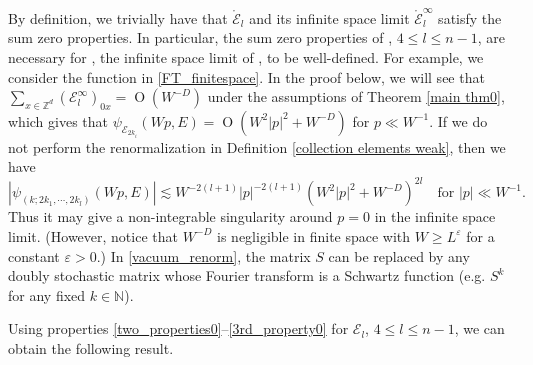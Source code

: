 \documentclass{article}
\newcommand{\1}{\mathds{1}}
\numberwithin{equation}{section}
\newcommand{\e}{{\varepsilon}}
\renewcommand{\leq}{\leqslant}
\renewcommand{\geq}{\geqslant}
\renewcommand{\le}{\leq}
\renewcommand{\ge}{\geq}
\newcommand{\N}{\mathbb{N}}
\newcommand{\Z}{\mathbb{Z}}
\DeclareMathOperator{\OO}{O}
\theoremstyle{plain} %
\theoremstyle{remark}
\newcommand{\Sele}{{\mathcal E}}
\begin{document}
By definition, we trivially have that $\mathring \Sele_l$ and its infinite space limit $\mathring \Sele_l^\infty$ satisfy the sum zero properties. In particular, the sum zero properties of \smash{$\mathring \Sele_l^\infty$}, $4\le l \le n-1$, are necessary for \smash{$\Sele_n^{(r),\infty}$}, the infinite space limit of \smash{$\Sele_n^{(r)}$}, to be well-defined. For example, we consider the function in \eqref{FT_finitespace}. In the proof below, we will see that $\sum_{x\in \Z^d}(\Sele^{\infty}_{l})_{0x} = \OO(W^{-D})$ under the assumptions of Theorem \ref{main thm0}, which gives that $\psi_{\Sele_{2k_i}}(Wp,E) = \OO(W^2|p|^2 + W^{-D})$ for $p\ll W^{-1}$. If we do not perform the renormalization in Definition \ref{collection elements weak}, then we have
$$\left|\psi_{ (k; 2k_1, \cdots, 2k_l)}(Wp,E)\right| \lesssim W^{-2(l+1)}|p|^{-2(l+1)} (W^2|p|^2 + W^{-D})^{2l} \quad \text{for $|p|\ll W^{-1}$}.  $$
Thus it may give a non-integrable singularity around $p=0$ in the infinite space limit. (However, notice that $W^{-D}$ is negligible in finite space with $W\ge L^{\e}$ for a constant $\e>0$.) In \eqref{vacuum_renorm}, the matrix $S$ can be replaced by any doubly stochastic matrix whose Fourier transform is a Schwartz function (e.g. $S^k$ for any fixed $k\in \N$).





Using properties \eqref{two_properties0}--\eqref{3rd_property0} for $\Sele_l$, $4\le l \le n-1$, we can obtain the following result. 
\end{document}
